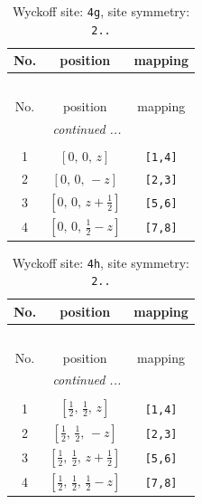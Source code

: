 \documentclass[fleqn,8pt]{jsarticle}
\begin{document}
\begin{longtable}{ccc}
\caption{Wyckoff site: {\tt 4g}, site symmetry: {\tt 2..}}
 \\
 \hline \hline
No. & position & mapping \\ \hline \endfirsthead

\multicolumn{2}{l}{\tablename\ \thetable{}} \\
 \hline \hline
No. & position & mapping \\ \hline \endhead

 \hline \hline
\multicolumn{2}{r}{\footnotesize\it continued ...} \\ \endfoot

 \hline \hline
\multicolumn{2}{r}{} \\ \endlastfoot

1 & $\left[ 0,\, 0,\, z \right]$ & {\tt [1,4]} \\ \hline
2 & $\left[ 0,\, 0,\, - z \right]$ & {\tt [2,3]} \\ \hline
3 & $\left[ 0,\, 0,\, z + \frac{1}{2} \right]$ & {\tt [5,6]} \\ \hline
4 & $\left[ 0,\, 0,\, \frac{1}{2} - z \right]$ & {\tt [7,8]} \\
\end{longtable}
\renewcommand{\arraystretch}{1.2}
\begin{longtable}{ccc}
\caption{Wyckoff site: {\tt 4h}, site symmetry: {\tt 2..}}
 \\
 \hline \hline
No. & position & mapping \\ \hline \endfirsthead

\multicolumn{2}{l}{\tablename\ \thetable{}} \\
 \hline \hline
No. & position & mapping \\ \hline \endhead

 \hline \hline
\multicolumn{2}{r}{\footnotesize\it continued ...} \\ \endfoot

 \hline \hline
\multicolumn{2}{r}{} \\ \endlastfoot

1 & $\left[ \frac{1}{2},\, \frac{1}{2},\, z \right]$ & {\tt [1,4]} \\ \hline
2 & $\left[ \frac{1}{2},\, \frac{1}{2},\, - z \right]$ & {\tt [2,3]} \\ \hline
3 & $\left[ \frac{1}{2},\, \frac{1}{2},\, z + \frac{1}{2} \right]$ & {\tt [5,6]} \\ \hline
4 & $\left[ \frac{1}{2},\, \frac{1}{2},\, \frac{1}{2} - z \right]$ & {\tt [7,8]} \\
\end{longtable}
\end{document}
